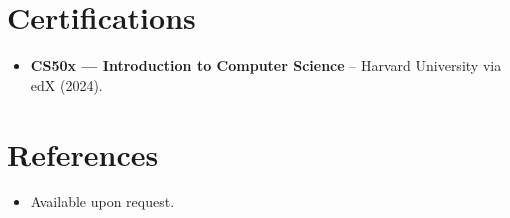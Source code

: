 \documentclass[11pt,a4paper,sans]{moderncv}
\begin{document}

\section{Certifications}
\vspace{1pt}
\begin{itemize}
\item{\textbf{CS50x --- Introduction to Computer Science} -- Harvard University via edX (2024).}
\end{itemize}


\section{References}
\vspace{1pt}
\begin{itemize}
\item{Available upon request.}
\end{itemize}
\end{document}
